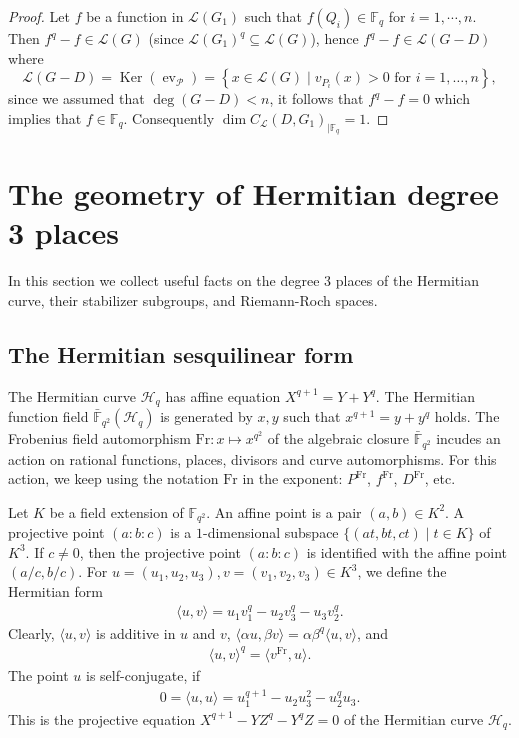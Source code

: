\documentclass[a4paper]{amsart}
\theoremstyle{plain}
\theoremstyle{definition}
\theoremstyle{remark}
\newcommand{\Frob}{\mathrm{Fr}}
\newcommand{\calP}{\mathcal{P}}
\begin{document}
\begin{proof}
	Let $f$ be a function in $\mathscr{L}(G_1)$ such that $f(Q_i) \in \mathbb{F}_q$ for $i=1,\cdots,n$. Then $f^q -f \in \mathscr{L}(G)$ (since $\mathscr{L}(G_1)^q \subseteq \mathscr{L}(G)$), hence $f^q - f \in  \mathscr{L}(G-D)$ where
	\[\mathscr{L}(G-D) = \operatorname{Ker}\left(\operatorname{ev}_{\calP}\right)=\left\{x \in \mathscr{L}(G) \mid v_{P_i}(x)>0 \text { for } i=1, \ldots, n\right\} ,\]
	since we assumed that $\deg (G-D)<n$, it follows that $f^q -f =0$ which implies that $f \in \mathbb{F}_q$. Consequently $\dim C_{\mathcal{L}}(D,G_1)_{\mid \mathbb{F}_q}= 1$.
\end{proof}






\section{The geometry of Hermitian degree 3 places}

In this section we collect useful facts on the degree 3 places of the Hermitian curve, their stabilizer subgroups, and Riemann-Roch spaces. 

\subsection{The Hermitian sesquilinear form}
The Hermitian curve $\mathscr{H}_q$ has affine equation $X^{q+1}=Y+Y^q$. The Hermitian function field $\bar{\mathbb{F}}_{q^2}(\mathscr{H}_q)$ is generated by $x,y$ such that $x^{q+1}=y+y^q$ holds. The Frobenius field automorphism $\Frob:x\mapsto x^{q^2}$ of the algebraic closure $\bar{\mathbb{F}}_{q^2}$ incudes an action on rational functions, places, divisors and curve automorphisms. For this action, we keep using the notation $\Frob$ in the exponent: $P^\Frob$, $f^\Frob$, $D^\Frob$, etc. 

Let $K$ be a field extension of $\mathbb{F}_{q^2}$. An affine point is a pair $(a,b)\in K^2$. A projective point $(a:b:c)$ is a $1$-dimensional subspace $\{(at,bt,ct) \mid t\in K\}$ of $K^3$. If $c\neq 0$, then the projective point $(a:b:c)$ is identified with the affine point $(a/c,b/c)$. For $u=(u_1,u_2,u_3), v=(v_1,v_2,v_3) \in K^3$, we define the Hermitian form 
\begin{align*} %
\langle u,v \rangle = u_1v_1^q-u_2v_3^q-u_3v_2^q.
\end{align*}
Clearly, $\langle u,v \rangle$ is additive in $u$ and $v$, $\langle \alpha u, \beta v\rangle =\alpha \beta^q \langle u,v \rangle$, and 
\begin{align*} %
\langle u,v \rangle^q=\langle v^\Frob,u \rangle.
\end{align*}
The point $u$ is self-conjugate, if 
\begin{align*} %
0=\langle u,u \rangle = u_1^{q+1}-u_2u_3^2-u_2^qu_3.
\end{align*}
This is the projective equation $X^{q+1}-YZ^q-Y^qZ=0$ of the Hermitian curve $\mathscr{H}_q$. 
\end{document}
